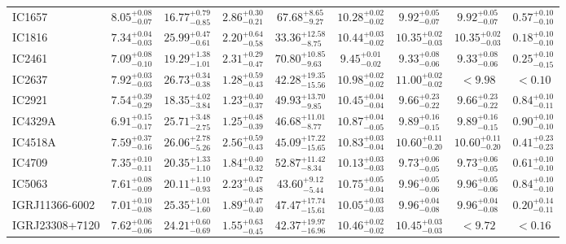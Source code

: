 \documentclass[onecolumn]{mn2e}
\begin{document}
{\begin{center}
\begin{longtable}{lcccccccc}
IC1657 & $8.05_{-0.07}^{+0.08}$ & $16.77_{-0.85}^{+0.79}$ & $2.86_{-0.21}^{+0.30}$ &$67.68_{-9.27}^{+8.65}$ & $10.28_{-0.02}^{+0.02}$ & $9.92_{-0.07}^{+0.05}$ & $9.92_{-0.07}^{+0.05}$ & $0.57_{-0.10}^{+0.10}$ \\
IC1816 & $7.34_{-0.03}^{+0.04}$ & $25.99_{-0.61}^{+0.47}$ & $2.20_{-0.58}^{+0.64}$ &$33.36_{-8.75}^{+12.58}$ & $10.44_{-0.02}^{+0.03}$ & $10.35_{-0.03}^{+0.02}$ & $10.35_{-0.03}^{+0.02}$ & $0.18_{-0.10}^{+0.10}$ \\
IC2461 & $7.09_{-0.10}^{+0.08}$ & $19.29_{-1.01}^{+1.38}$ & $2.31_{-0.47}^{+0.29}$ &$70.80_{-9.63}^{+10.85}$ & $9.45_{-0.02}^{+0.01}$ & $9.33_{-0.06}^{+0.08}$ & $9.33_{-0.06}^{+0.08}$ & $0.25_{-0.15}^{+0.10}$ \\
IC2637 & $7.92_{-0.03}^{+0.03}$ & $26.73_{-0.38}^{+0.34}$ & $1.28_{-0.43}^{+0.59}$ &$42.28_{-15.56}^{+19.35}$ & $10.98_{-0.02}^{+0.02}$ & $11.00_{-0.02}^{+0.02}$ & $<9.98$ & $<0.10$ \\
IC2921 & $7.54_{-0.29}^{+0.39}$ & $18.35_{-3.84}^{+4.02}$ & $1.23_{-0.37}^{+0.40}$ &$49.93_{-9.85}^{+13.70}$ & $10.45_{-0.04}^{+0.04}$ & $9.66_{-0.22}^{+0.23}$ & $9.66_{-0.22}^{+0.23}$ & $0.84_{-0.11}^{+0.10}$ \\
IC4329A & $6.91_{-0.17}^{+0.15}$ & $25.71_{-2.75}^{+3.48}$ & $1.25_{-0.39}^{+0.48}$ &$46.68_{-8.77}^{+11.01}$ & $10.87_{-0.05}^{+0.04}$ & $9.89_{-0.15}^{+0.16}$ & $9.89_{-0.15}^{+0.16}$ & $0.90_{-0.10}^{+0.10}$ \\
IC4518A & $7.59_{-0.16}^{+0.37}$ & $26.06_{-5.26}^{+2.78}$ & $2.56_{-0.43}^{+0.59}$ &$45.09_{-15.65}^{+17.22}$ & $10.83_{-0.04}^{+0.03}$ & $10.60_{-0.20}^{+0.11}$ & $10.60_{-0.20}^{+0.11}$ & $0.41_{-0.23}^{+0.23}$ \\
IC4709 & $7.35_{-0.11}^{+0.10}$ & $20.35_{-1.10}^{+1.33}$ & $1.84_{-0.32}^{+0.40}$ &$52.87_{-8.34}^{+11.42}$ & $10.13_{-0.03}^{+0.03}$ & $9.73_{-0.05}^{+0.06}$ & $9.73_{-0.05}^{+0.06}$ & $0.61_{-0.10}^{+0.10}$ \\
IC5063 & $7.61_{-0.09}^{+0.08}$ & $20.11_{-0.93}^{+1.10}$ & $2.23_{-0.48}^{+0.47}$ &$43.60_{-5.44}^{+9.12}$ & $10.75_{-0.04}^{+0.05}$ & $9.96_{-0.06}^{+0.05}$ & $9.96_{-0.06}^{+0.05}$ & $0.84_{-0.10}^{+0.10}$ \\
IGRJ11366-6002 & $7.01_{-0.08}^{+0.10}$ & $25.35_{-1.60}^{+1.01}$ & $1.89_{-0.40}^{+0.47}$ &$47.47_{-15.61}^{+17.74}$ & $10.05_{-0.03}^{+0.03}$ & $9.96_{-0.08}^{+0.04}$ & $9.96_{-0.08}^{+0.04}$ & $0.20_{-0.11}^{+0.14}$ \\
IGRJ23308+7120 & $7.62_{-0.06}^{+0.06}$ & $24.21_{-0.69}^{+0.60}$ & $1.55_{-0.45}^{+0.63}$ &$42.37_{-16.96}^{+19.97}$ & $10.46_{-0.02}^{+0.02}$ & $10.45_{-0.03}^{+0.03}$ & $<9.72$ & $<0.16$ \\

\end{longtable}
\end{center}}
\end{document}
